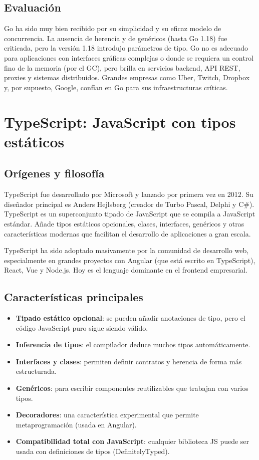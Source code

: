 \subsection{Evaluación}

Go ha sido muy bien recibido por su simplicidad y su eficaz modelo de concurrencia. La ausencia de herencia y de genéricos (hasta Go 1.18) fue criticada, pero la versión 1.18 introdujo parámetros de tipo. Go no es adecuado para aplicaciones con interfaces gráficas complejas o donde se requiera un control fino de la memoria (por el GC), pero brilla en servicios backend, API REST, proxies y sistemas distribuidos. Grandes empresas como Uber, Twitch, Dropbox y, por supuesto, Google, confían en Go para sus infraestructuras críticas.

\section{TypeScript: JavaScript con tipos estáticos}

\subsection{Orígenes y filosofía}

TypeScript fue desarrollado por Microsoft y lanzado por primera vez en 2012. Su diseñador principal es Anders Hejlsberg (creador de Turbo Pascal, Delphi y C\#). TypeScript es un superconjunto tipado de JavaScript que se compila a JavaScript estándar. Añade tipos estáticos opcionales, clases, interfaces, genéricos y otras características modernas que facilitan el desarrollo de aplicaciones a gran escala.

TypeScript ha sido adoptado masivamente por la comunidad de desarrollo web, especialmente en grandes proyectos con Angular (que está escrito en TypeScript), React, Vue y Node.js. Hoy es el lenguaje dominante en el frontend empresarial.

\subsection{Características principales}

\begin{itemize}
  \item \textbf{Tipado estático opcional}: se pueden añadir anotaciones de tipo, pero el código JavaScript puro sigue siendo válido.
  \item \textbf{Inferencia de tipos}: el compilador deduce muchos tipos automáticamente.
  \item \textbf{Interfaces y clases}: permiten definir contratos y herencia de forma más estructurada.
  \item \textbf{Genéricos}: para escribir componentes reutilizables que trabajan con varios tipos.
  \item \textbf{Decoradores}: una característica experimental que permite metaprogramación (usada en Angular).
  \item \textbf{Compatibilidad total con JavaScript}: cualquier biblioteca JS puede ser usada con definiciones de tipos (DefinitelyTyped).
\end{itemize}

